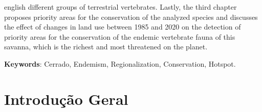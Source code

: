 \documentclass[12pt,openright,oneside,a4paper,english]{abntex2}
\begin{document}
\begin{resumo}[Abstract]
\begin{otherlanguage*}{english}
different groups of terrestrial vertebrates. Lastly, the third chapter proposes priority areas for the conservation of the analyzed species and discusses the effect of changes in land use between 1985 and 2020 on the detection of priority areas for the conservation of the endemic vertebrate fauna of this savanna, which is the richest and most threatened on the planet.
		\vspace{\onelineskip}
		\noindent
		
		\textbf{Keywords}: Cerrado, Endemism, Regionalization, Conservation, Hotspot.
	\end{otherlanguage*}
\end{resumo}

\tableofcontents
{}

\pagebreak


\textual
\setlength{\parindent}{1cm}
\newpage


\chapter*[Introdução Geral]{Introdução Geral}

\end{document}

